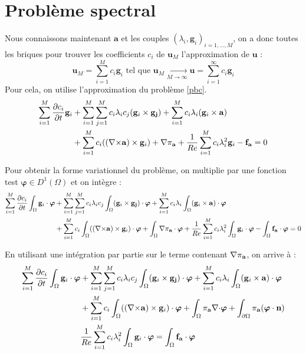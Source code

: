 \section{Problème spectral}
\label{spectre}
Nous connaissons maintenant $\mathbf{a}$ et les couples $(\lambda_i,\mathbf{g}_i)_{i=1,\dots,M}$, on a donc toutes les briques pour trouver les coefficients $c_i$ de $\mathbf{u}_M$ l'approximation de $\mathbf{u}$ :
\[\mathbf{u}_M= \sum_{i=1}^M c_i\mathbf{g}_i\mbox{ tel que } \mathbf{u}_M\underset{M\rightarrow\infty}{\longrightarrow} \mathbf{u}=\sum_{i=1}^\infty c_i\mathbf{g}_i\]
Pour cela, on utilise l'approximation du problème \ref{pbc}.
\begin{align*}
\sum_{i=1}^M\frac{\partial c_i}{\partial t}\mathbf{g}_i &+ \sum_{i=1}^M\sum_{j=1}^Mc_i\lambda_ic_j(\mathbf{g}_i\times \mathbf{g_j}) + \sum_{i=1}^Mc_i\lambda_i(\mathbf{g}_i\times \mathbf{a})\\
& +  \sum_{i=1}^Mc_i(({\nabla\times}\mathbf{a})\times \mathbf{g}_i) + {\nabla} \pi_{\mathbf{a}} +\frac{1}{Re}\sum_{i=1}^Mc_i\lambda_i^2\mathbf{g}_i - \mathbf{f_a} = 0\\
\end{align*}

Pour obtenir la forme variationnel du problème, on multiplie par une fonction test $\bm{\varphi}\in D^1(\Omega)$ et on intègre :
\begin{align*}
\sum_{i=1}^M\frac{\partial c_i}{\partial t}\int_\Omega\mathbf{g}_i\cdot\bm{\varphi} &+ \sum_{i=1}^M\sum_{j=1}^Mc_i\lambda_ic_j\int_\Omega(\mathbf{g}_i\times \mathbf{g_j})\cdot\bm{\varphi} + \sum_{i=1}^Mc_i\lambda_i\int_\Omega(\mathbf{g}_i\times \mathbf{a})\cdot\bm{\varphi}\\
& +  \sum_{i=1}^Mc_i\int_\Omega(({\nabla\times}\mathbf{a})\times \mathbf{g}_i)\cdot\bm{\varphi} + \int_\Omega{\nabla} \pi_{\mathbf{a}}\cdot\bm{\varphi} +\frac{1}{Re}\sum_{i=1}^Mc_i\lambda_i^2\int_\Omega\mathbf{g}_i\cdot\bm{\varphi} - \int_\Omega\mathbf{f_a}\cdot\bm{\varphi} = 0\\
\end{align*}

En utilisant une intégration par partie sur le terme contenant ${\nabla}\pi_{\mathbf{a}}$, on arrive à :
\begin{align*}
\sum_{i=1}^M\frac{\partial c_i}{\partial t}\int_\Omega\mathbf{g}_i\cdot\bm{\varphi} &+ \sum_{i=1}^M\sum_{j=1}^Mc_i\lambda_ic_j\int_\Omega(\mathbf{g}_i\times \mathbf{g_j})\cdot\bm{\varphi} + \sum_{i=1}^Mc_i\lambda_i\int_\Omega(\mathbf{g}_i\times \mathbf{a})\cdot\bm{\varphi}\\
& +  \sum_{i=1}^Mc_i\int_\Omega(({\nabla\times}\mathbf{a})\times \mathbf{g}_i)\cdot\bm{\varphi} + \int_\Omega\pi_{\mathbf{a}}{\nabla\cdot}\bm{\varphi} + \int_{\partial\Omega}\pi_{\mathbf{a}}(\bm{\varphi}\cdot\mathbf{n})\\
& \frac{1}{Re}\sum_{i=1}^Mc_i\lambda_i^2\int_\Omega\mathbf{g}_i\cdot\bm{\varphi} = \int_\Omega\mathbf{f_a}\cdot\bm{\varphi}\\
\end{align*}

